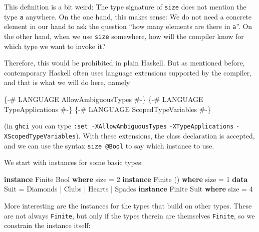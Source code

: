 \documentclass[11pt,
  american,
  DIV13]{article}
\newenvironment{Shaded}{}{}
\newcommand{\DataTypeTok}[1]{\textcolor[rgb]{0.56,0.13,0.00}{#1}}
\newcommand{\DecValTok}[1]{\textcolor[rgb]{0.25,0.63,0.44}{#1}}
\newcommand{\KeywordTok}[1]{\textcolor[rgb]{0.00,0.44,0.13}{\textbf{#1}}}
\newcommand{\NormalTok}[1]{#1}
\newcommand{\OperatorTok}[1]{\textcolor[rgb]{0.40,0.40,0.40}{#1}}
\newcommand{\OtherTok}[1]{\textcolor[rgb]{0.00,0.44,0.13}{#1}}
\begin{document}
This definition is a bit weird: The type signature of \texttt{size} does
not mention the type \texttt{a} anywhere. On the one hand, this makes
sense: We do not need a concrete element in our hand to ask the question
``how many elements are there in \texttt{a}''. On the other hand, when
we use \texttt{size} somewhere, how will the compiler know for which
type we want to invoke it?

Therefore, this would be prohibited in plain Haskell. But as mentioned
before, contemporary Haskell often uses language extensions supported by
the compiler, and that is what we will do here, namely

\begin{Shaded}
\begin{Highlighting}[]
\OtherTok{\{{-}\# LANGUAGE AllowAmbiguousTypes \#{-}\}}
\OtherTok{\{{-}\# LANGUAGE TypeApplications \#{-}\}}
\OtherTok{\{{-}\# LANGUAGE ScopedTypeVariables \#{-}\}}
\end{Highlighting}
\end{Shaded}

(in \texttt{ghci} you can type
\texttt{:set\ -XAllowAmbiguousTypes} \texttt{-XTypeApplications} \break \texttt{-XScopedTypeVariables}).
With these extensions, the class declaration is accepted, and we can use
the syntax \texttt{size\ @Bool} to say which instance to use.

We start with instances for some basic types:

\begin{Shaded}
\begin{Highlighting}[]
\KeywordTok{instance} \DataTypeTok{Finite} \DataTypeTok{Bool} \KeywordTok{where}\NormalTok{ size }\OtherTok{=} \DecValTok{2}
\KeywordTok{instance} \DataTypeTok{Finite}\NormalTok{ () }\KeywordTok{where}\NormalTok{ size }\OtherTok{=} \DecValTok{1}
\KeywordTok{data} \DataTypeTok{Suit} \OtherTok{=} \DataTypeTok{Diamonds} \OperatorTok{|} \DataTypeTok{Clubs} \OperatorTok{|} \DataTypeTok{Hearts} \OperatorTok{|} \DataTypeTok{Spades}
\KeywordTok{instance} \DataTypeTok{Finite} \DataTypeTok{Suit} \KeywordTok{where}\NormalTok{ size }\OtherTok{=} \DecValTok{4}
\end{Highlighting}
\end{Shaded}

More interesting are the instances for the types that build on other
types. These are not always \texttt{Finite}, but only if the types
therein are themselves \texttt{Finite}, so we constrain the instance
itself:
\end{document}
